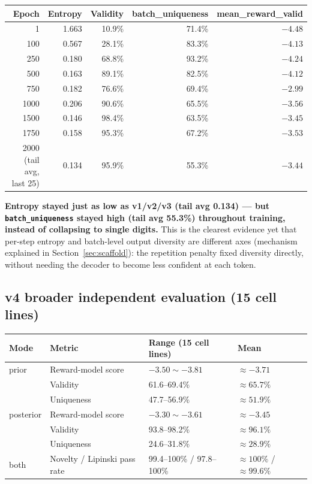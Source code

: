\documentclass[11pt]{article}
\newcommand{\code}[1]{\texttt{#1}}
\begin{document}
\begin{center}
\begin{tabular}{@{}r r r r r@{}}
\toprule
\textbf{Epoch} & \textbf{Entropy} & \textbf{Validity} & \textbf{batch\_uniqueness} & \textbf{mean\_reward\_valid} \\
\midrule
1 & 1.663 & 10.9\% & 71.4\% & $-4.48$ \\
100 & 0.567 & 28.1\% & 83.3\% & $-4.13$ \\
250 & 0.180 & 68.8\% & 93.2\% & $-4.24$ \\
500 & 0.163 & 89.1\% & 82.5\% & $-4.12$ \\
750 & 0.182 & 76.6\% & 69.4\% & $-2.99$ \\
1000 & 0.206 & 90.6\% & 65.5\% & $-3.56$ \\
1500 & 0.146 & 98.4\% & 63.5\% & $-3.45$ \\
1750 & 0.158 & 95.3\% & 67.2\% & $-3.53$ \\
2000 (tail avg, last 25) & 0.134 & 95.9\% & 55.3\% & $-3.44$ \\
\bottomrule
\end{tabular}
\end{center}

\textbf{Entropy stayed just as low as v1/v2/v3 (tail avg 0.134) --- but \code{batch\_uniqueness} stayed high (tail avg 55.3\%) throughout training, instead of collapsing to single digits.} This is the clearest evidence yet that per-step entropy and batch-level output diversity are different axes (mechanism explained in Section~\ref{sec:scaffold}): the repetition penalty fixed diversity directly, without needing the decoder to become less confident at each token.

\subsection{v4 broader independent evaluation (15 cell lines)}

\begin{center}
\begin{tabular}{@{}l l l l@{}}
\toprule
\textbf{Mode} & \textbf{Metric} & \textbf{Range (15 cell lines)} & \textbf{Mean} \\
\midrule
prior & Reward-model score & $-3.50\sim-3.81$ & $\approx -3.71$ \\
 & Validity & 61.6--69.4\% & $\approx 65.7\%$ \\
 & Uniqueness & 47.7--56.9\% & $\approx 51.9\%$ \\
posterior & Reward-model score & $-3.30\sim-3.61$ & $\approx -3.45$ \\
 & Validity & 93.8--98.2\% & $\approx 96.1\%$ \\
 & Uniqueness & 24.6--31.8\% & $\approx 28.9\%$ \\
both & Novelty / Lipinski pass rate & 99.4--100\% / 97.8--100\% & $\approx 100\%$ / $\approx 99.6\%$ \\
\bottomrule
\end{tabular}
\end{center}
\end{document}
